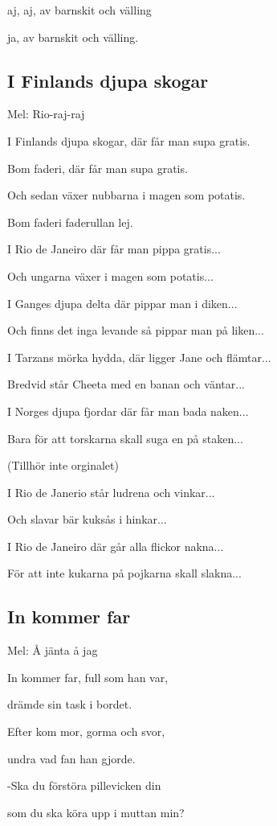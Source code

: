 aj, aj, av barnskit och välling

ja, av barnskit och välling. 

\subsection{\textbf{I Finlands djupa skogar}}

Mel: Rio-raj-raj \bigskip


I Finlands djupa skogar, där får man supa gratis.

Bom faderi, där får man supa gratis.

Och sedan växer nubbarna i magen som potatis.

Bom faderi faderullan lej.

I Rio de Janeiro där får man pippa gratis...

Och ungarna växer i magen som potatis...

I Ganges djupa delta där pippar man i diken...

Och finns det inga levande så pippar man på liken...

I Tarzans mörka hydda, där ligger Jane och flämtar...

Bredvid står Cheeta med en banan och väntar...

I Norges djupa fjordar där får man bada naken...

Bara för att torskarna skall suga en på staken...

(Tillhör inte orginalet)

I Rio de Janerio står ludrena och vinkar...

Och slavar bär kuksås i hinkar...

I Rio de Janeiro där går alla flickor nakna...

För att inte kukarna på pojkarna skall slakna... 

\subsection{\textbf{In kommer far}}

Mel: Å jänta å jag\bigskip

In kommer far, full som han var,

drämde sin task i bordet.

Efter kom mor, gorma och svor,

undra vad fan han gjorde.

-Ska du förstöra pillevicken din

som du ska köra upp i muttan min?

